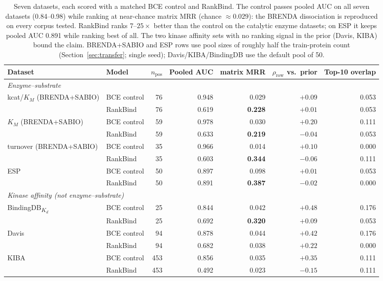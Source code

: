 \documentclass[11pt,a4paper]{article}
\newcommand{\method}{RankBind\xspace}
\newcommand{\mrr}{matrix MRR}
\begin{document}
\begin{table}[t]
\centering
\caption{Seven datasets, each scored with a matched BCE control and
\method. The control passes pooled AUC on all seven datasets (0.84--0.98)
while ranking at near-chance \mrr{} (chance $\approx 0.029$): the BRENDA
dissociation is reproduced on every corpus tested. \method{} ranks $7$--$25\times$
better than the control on the catalytic enzyme datasets; on ESP it keeps
pooled AUC 0.891 while ranking best of all. The two kinase affinity sets
with no ranking signal in the prior (Davis, KIBA) bound the claim.
BRENDA+SABIO and ESP rows use pool sizes of roughly half the
train-protein count (Section~\ref{sec:transfer}; single seed);
Davis/KIBA/BindingDB use the default pool of 50.}
\label{tab:seven}
\footnotesize
\setlength{\tabcolsep}{3.5pt}
\begin{tabular}{llrrrrr}
\toprule
Dataset & Model & $n_{\text{pos}}$ & Pooled AUC & \mrr{} & $\rho_{\text{row}}$ vs.\ prior & Top-10 overlap \\
\midrule
\multicolumn{7}{l}{\emph{Enzyme--substrate}}\\
kcat/$K_M$ (BRENDA+SABIO) & BCE control & 76 & 0.948 & 0.029 & $+0.09$ & 0.053 \\
                          & \method     & 76 & 0.619 & \textbf{0.228} & $+0.01$ & 0.053 \\
$K_M$ (BRENDA+SABIO)      & BCE control & 59 & 0.978 & 0.030 & $+0.20$ & 0.111 \\
                          & \method     & 59 & 0.633 & \textbf{0.219} & $-0.04$ & 0.053 \\
turnover (BRENDA+SABIO)   & BCE control & 35 & 0.966 & 0.014 & $+0.10$ & 0.000 \\
                          & \method     & 35 & 0.603 & \textbf{0.344} & $-0.06$ & 0.111 \\
ESP                       & BCE control & 50 & 0.897 & 0.098 & $+0.01$ & 0.053 \\
                          & \method     & 50 & 0.891 & \textbf{0.387} & $-0.02$ & 0.000 \\
\midrule
\multicolumn{7}{l}{\emph{Kinase affinity (not enzyme--substrate)}}\\
BindingDB\textsubscript{$K_d$} & BCE control & 25 & 0.844 & 0.042 & $+0.48$ & 0.176 \\
                               & \method     & 25 & 0.692 & \textbf{0.320} & $+0.09$ & 0.053 \\
Davis                        & BCE control & 94 & 0.878 & 0.044 & $+0.42$ & 0.176 \\
                             & \method     & 94 & 0.682 & 0.038 & $+0.22$ & 0.000 \\
KIBA                         & BCE control & 453 & 0.856 & 0.035 & $+0.35$ & 0.111 \\
                             & \method     & 453 & 0.492 & 0.023 & $-0.15$ & 0.111 \\
\bottomrule
\end{tabular}
\end{table}
\end{document}
